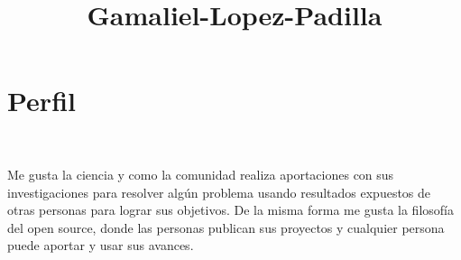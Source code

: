 \documentclass[a3paper]{adcv_color}
\title{Gamaliel-Lopez-Padilla}
\begin{document}
\changefontsizes{14pt}
\section{Perfil}\\
\begin{addmargin}[0.5em]{0.2em}
	\begin{flushleft}
		Me gusta la ciencia y como la comunidad realiza  aportaciones con sus investigaciones para resolver algún problema usando resultados expuestos de otras personas para lograr sus objetivos. De la misma forma me gusta la filosofía del open source, donde las personas publican sus proyectos y cualquier persona puede aportar y usar sus avances.\\
	\end{flushleft}
\end{addmargin}
\end{document}

